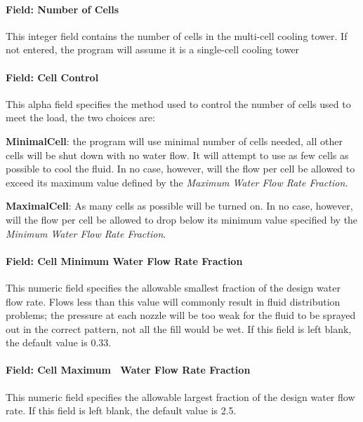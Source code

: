 \paragraph{Field: Number of Cells}\label{field-number-of-cells-1}

This integer field contains the number of cells in the multi-cell cooling tower. If not entered, the program will assume it is a single-cell cooling tower

\paragraph{Field: Cell Control}\label{field-cell-control-1}

This alpha field specifies the method used to control the number of cells used to meet the load, the two choices are:

\textbf{MinimalCell}: the program will use minimal number of cells needed, all other cells will be shut down with no water flow. It will attempt to use as few cells as possible to cool the fluid. In no case, however, will the flow per cell be allowed to exceed its maximum value defined by the \emph{Maximum Water Flow Rate Fraction.}

\textbf{MaximalCell}: As many cells as possible will be turned on. In no case, however, will the flow per cell be allowed to drop below its minimum value specified by the \emph{Minimum Water Flow Rate Fraction}.

\paragraph{Field: Cell Minimum Water Flow Rate Fraction}\label{field-cell-minimum-water-flow-rate-fraction-1}

This numeric field specifies the allowable smallest fraction of the design water flow rate. Flows less than this value will commonly result in fluid distribution problems; the pressure at each nozzle will be too weak for the fluid to be sprayed out in the correct pattern, not all the fill would be wet. If this field is left blank, the default value is 0.33.

\paragraph{Field: Cell Maximum~ Water Flow Rate Fraction}\label{field-cell-maximum-water-flow-rate-fraction-1}

This numeric field specifies the allowable largest fraction of the design water flow rate. If this field is left blank, the default value is 2.5.


